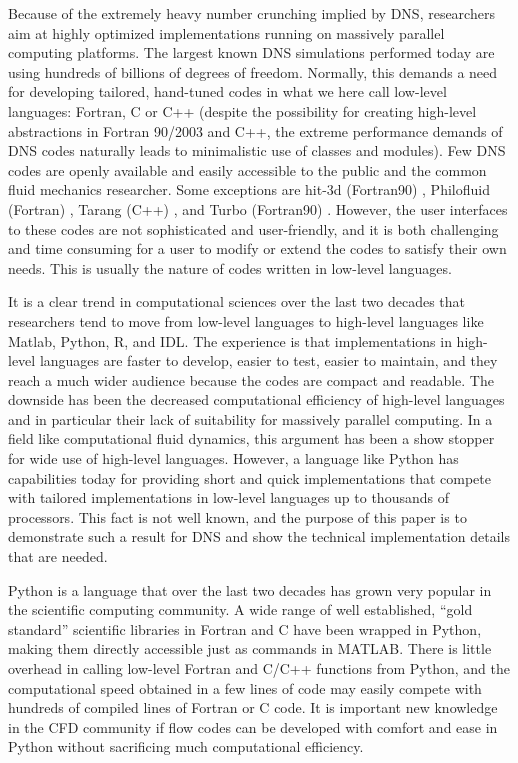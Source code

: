 \documentclass[final,1p,times]{elsarticle}
\begin{document}
Because of the extremely heavy number crunching implied by DNS,
researchers aim at highly optimized implementations running on
massively parallel computing platforms. The largest known DNS
simulations performed today are using hundreds of billions of degrees
of freedom. Normally, this demands a need for developing tailored, hand-tuned
codes in what we here call low-level languages: Fortran, C or C++ (despite
the possibility for creating high-level abstractions in Fortran 90/2003 and
C++, the extreme performance demands of DNS codes naturally leads to
minimalistic use of classes and modules). Few
DNS codes are openly available and easily accessible to the public and
the common fluid mechanics researcher. Some exceptions are hit-3d
(Fortran90) \cite{hit-3d}, Philofluid (Fortran) \cite{philofluid},
Tarang (C++) \cite{tarang}, and Turbo (Fortran90)
\cite{turbo}. However, the user interfaces to these codes are not sophisticated and user-friendly,
and it is both challenging and time consuming for a user to
modify or extend the codes to satisfy their own needs. This is usually
the nature of codes written in low-level languages.

It is a clear trend in computational sciences over the last two decades
that researchers tend to move from low-level languages to high-level languages
like Matlab, Python, R, and IDL. The experience is that implementations
in high-level languages are faster to develop, easier to test,
easier to maintain, and they
reach a much wider audience because the codes are compact and readable.
The downside has been the decreased computational
efficiency of high-level languages and in particular their lack of
suitability for massively parallel computing. In a field like computational
fluid dynamics, this argument has been a show stopper for wide use
of high-level languages. However, a language like Python has capabilities
today for providing short and quick implementations that compete with
tailored implementations in low-level languages up to thousands of processors.
This fact is not well known, and the purpose of this paper is to
demonstrate such a result for DNS and show the technical implementation
details that are needed.


Python is a language that over the last two decades has grown very popular in the scientific computing community. A wide range of well established, ``gold standard'' scientific libraries in Fortran and C have been wrapped in Python, making them directly accessible just as commands in MATLAB. There is little overhead in calling low-level Fortran and C/C++ functions from Python, and the computational speed obtained in a few lines of code may easily compete with hundreds of compiled lines of Fortran or C code. It is important new knowledge in the CFD community if flow codes can be developed with comfort and ease in Python without sacrificing much computational efficiency.
\end{document}

